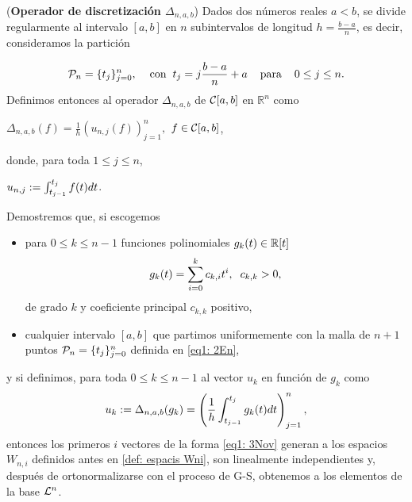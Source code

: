 \begin{defi}
(\textbf{Operador de discretización $\Delta_{n,a,b}$})
Dados dos números reales $a<b$, se divide
regularmente al intervalo $[a,b]$ en 
$n$ subintervalos de longitud $h=\frac{b-a}{n}$,
es decir, consideramos la partición


\begin{equation}
\label{eq1: 2En}
\mathcal{P}_{n}= \{ t_{j} \}_{j=0}^{n}, 
\hspace{0.4cm} \text{con} \hspace{0.2cm}
t_{j}=j\frac{b-a}{n}+a \hspace{0.4cm} \text{para}\hspace{0.4cm}
 0 \leq j \leq n.
\end{equation}
Definimos entonces al operador $\Delta_{n,a,b}$ 
de $\mathcal{C}[a,b]$ en $\mathbb{R}^{n}$ como
\begin{center}
$\Delta_{n,a,b}(f)= \frac{1}{h} (u_{n,j}(f))_{j=1}^{n},$ \hspace{0.3cm}
$f \in \mathcal{C}[a,b]$,
\end{center}
donde, para toda $1 \leq j \leq n$,
\begin{center}
$u_{n,j}:= \int_{t_{j-1}}^{t_{j}}{f(t)dt}$.
\end{center}
\end{defi}



\noindent
Demostremos que, si escogemos
\begin{itemize}
\item para $0 \leq k \leq n-1$ funciones polinomiales
$g_{k}(t) \in \mathbb{R}[t]$
\begin{equation}
\label{eq10: 3Nov}
g_{k}(t)= \sum\limits_{i=0}^{k}c_{k,i}t^{i},
\hspace{0.2cm} c_{k, k} >0,
\end{equation}
de grado $k$ y coeficiente principal 
$c_{k,k}$ positivo, 

\item cualquier intervalo $[a,b]$ que partimos 
uniformemente con la malla de $n+1$ puntos
$\mathcal{P}_{n}= \{ t_{j} \}_{j=0}^{n}$ 
definida en \eqref{eq1: 2En},

\end{itemize}

y si definimos, para toda $0\leq k \leq  n-1$
al vector $u_{k}$ en función de $g_{k}$ como 
\begin{equation}
\label{eq1: 3Nov}
u_{k}:= \Delta_{n,a,b}(g_{k})
= \left( \frac{1}{h} 
\int_{t_{j-1}}^{t_{j}}{g_{k}(t)dt} \right)_{j=1}^{n} , 
\end{equation}
entonces los primeros $i$ vectores
de la forma \eqref{eq1: 3Nov}
generan a los espacios $W_{n,i}$
definidos antes en 
\ref{def: espacis Wni},
son linealmente independientes y,
después de ortonormalizarse con 
el proceso de G-S,
obtenemos a los elementos de la base $\mathcal{L}^{n}$.

